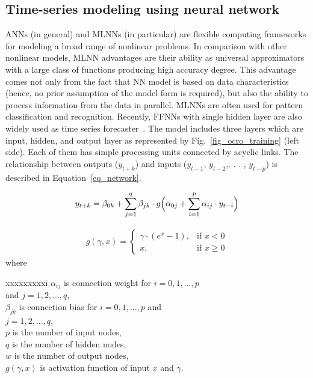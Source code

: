 \documentclass[11pt,twoside]{article}
\begin{document}
\begin{multicols}{2}
\subsection{Time-series modeling using neural network}
\label{mlnn_model}

ANNs (in general) and MLNNs (in particular) are flexible computing frameworks for modeling a broad range of nonlinear problems. In comparison with other nonlinear models, MLNN advantages are their ability as universal approximators with a large class of functions producing high accuracy degree. This advantage comes not only from the fact that NN model is based on data characteristics (hence, no prior assumption of the model form is required), but also the ability to process information from the data in parallel. MLNNs are often used for pattern classification and recognition. Recently, FFNNs with single hidden layer are also widely used as time series forecaster~\citep{ref_zhang2}. The model includes three layers which are input, hidden, and output layer as represented by Fig.~\ref{fig_ocro_training} (left side). Each of them has simple processing units connected by acyclic links. The relationship between outputs ($y_{t+k}$) and inputs \newline ($y_{t-1}$, $y_{t-2}$,. . . , $y_{t-p}$) is described in Equation~\ref{eq_network}. 

\begin{align} \label{eq_network}
	y_{t+k} = \beta_{0k} + \sum_{j=1}^q \beta_{jk} \cdot  g\Bigl( \alpha_{0j} + \sum_{i=1}^p \alpha_{ij} \cdot y_{t-i} \Bigr) 
\end{align}

\begin{align} \label{eq_activation}
	g(\gamma, x) = \begin{cases}  \gamma \cdot (e^x - 1) , & \mbox{if } x < 0\\ x, & \mbox{if } x \geq 0 \end{cases}
\end{align}
where 	
\begin{tabbing}
	xxx\=xxxxxxi\=\kill
	\>	$\alpha_{ij}$	\> is connection weight for	$i = 0, 1,..., p$ \\
	\>	\hphantom{invi}	\> and $j = 1, 2,..., q$,	\\
	\>	$\beta_{jk}$	\> is connection bias for $i = 0, 1,..., p$ and \\
	\>	\hphantom{invi}	\> $j = 1, 2,..., q$,	\\
	\>	$p$ 			\>	is the number of input nodes,		\\
	\>	$q$ 			\>	is the number of hidden nodes,	\\
	\>	$w$ 			\>	is the number of output nodes, 	\\
	\>	$g(\gamma, x)$ 	\>	is activation function of input $x$ and $\gamma$. 			
\end{tabbing}


\end{multicols}
\end{document}
